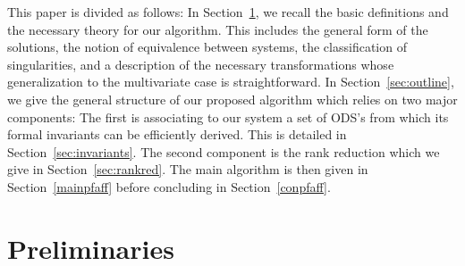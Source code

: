 \documentclass[final,1p,times,number,amsthm]{elsart}
\begin{document}
This paper is divided as follows: In Section~\ref{sec:prelim}, we recall the
basic definitions and the necessary theory for our algorithm. This includes the
general form of the solutions, the notion of equivalence between systems, the
classification of singularities, and a description of the necessary
transformations whose generalization to the multivariate case is
straightforward. In Section~\ref{sec:outline}, we give the general structure of
our proposed algorithm which relies on two major components: The first is
associating to our system a set of ODS's from which its formal invariants can be
efficiently derived. This is detailed in Section~\ref{sec:invariants}. The
second component is the rank reduction which we give in
Section~\ref{sec:rankred}. The main algorithm is then given in
Section~\ref{mainpfaff} before concluding in Section~\ref{conpfaff}.

\section{Preliminaries}
\label{sec:prelim}
\end{document}
